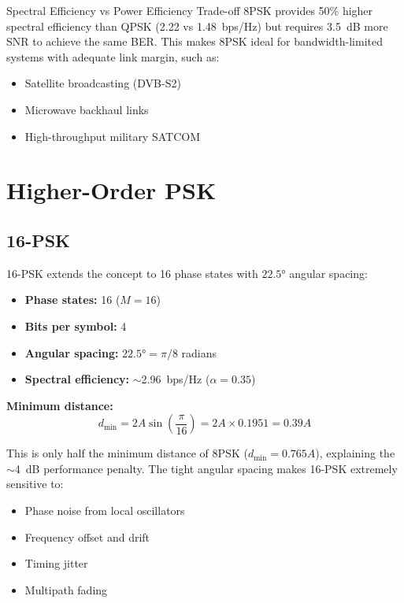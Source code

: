 \begin{calloutbox}{Spectral Efficiency vs Power Efficiency Trade-off}
8PSK provides 50\% higher spectral efficiency than QPSK (2.22 vs 1.48~bps/Hz) but requires 3.5~dB more SNR to achieve the same BER. This makes 8PSK ideal for bandwidth-limited systems with adequate link margin, such as:
\begin{itemize}
\item Satellite broadcasting (DVB-S2)
\item Microwave backhaul links
\item High-throughput military SATCOM
\end{itemize}
\end{calloutbox}

\section{Higher-Order PSK}

\subsection{16-PSK}

16-PSK extends the concept to 16 phase states with $22.5°$ angular spacing:
\begin{itemize}
\item \textbf{Phase states:} 16 ($M = 16$)
\item \textbf{Bits per symbol:} 4
\item \textbf{Angular spacing:} $22.5° = \pi/8$ radians
\item \textbf{Spectral efficiency:} $\sim$2.96~bps/Hz ($\alpha = 0.35$)
\end{itemize}

\textbf{Minimum distance:}
\begin{equation}
d_{\min} = 2A\sin\left(\frac{\pi}{16}\right) = 2A \times 0.1951 = 0.39A
\end{equation}

This is only half the minimum distance of 8PSK ($d_{\min} = 0.765A$), explaining the $\sim$4~dB performance penalty. The tight angular spacing makes 16-PSK extremely sensitive to:
\begin{itemize}
\item Phase noise from local oscillators
\item Frequency offset and drift
\item Timing jitter
\item Multipath fading
\end{itemize}

